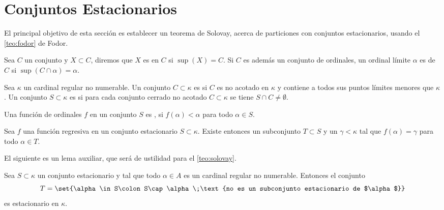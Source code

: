 \section{Conjuntos Estacionarios}

El principal objetivo de esta sección es establecer un teorema
de Solovay, acerca de particiones
con conjuntos estacionarios, usando el \cref{teo:fodor}
de Fodor.

Sea $C$ un conjunto y $X\subset C$, diremos que $X$ es 
en $C$ si $\sup(X) = C$.
Si $C$ es además un conjunto de ordinales, un ordinal límite $\alpha$ es
 de $C$ si $\sup ( C \cap\alpha ) = \alpha$.
\begin{defi}
    Sea $\kappa$ un cardinal regular no numerable. Un conjunto $C\subset \kappa$
    es  si $C$ es no acotado en $\kappa$ y contiene a
    todos sus puntos límites menores que $\kappa$.
    Un conjunto $S\subset\kappa$ es  si para cada conjunto
    cerrado no acotado $C\subset\kappa$ se tiene $S\cap C\neq\emptyset$.
\end{defi}


\begin{defi}
    Una función de ordinales $f$ en un conjunto $S$ es , si
    $f(\alpha)<\alpha$ para todo $\alpha\in S$.
\end{defi}

\begin{teo}\label{teo:fodor}
    Sea $f$ una función regresiva en un conjunto estacionario $S\subset\kappa$.
    Existe entonces un subconjunto $T\subset S$ y un $\gamma<\kappa$ tal que
    $f(\alpha) = \gamma$ para todo $\alpha\in T$.
\end{teo}

El siguiente es un lema auxiliar, que será de ustilidad para el \cref{teo:solovay}.

\begin{lem}
    Sea $S\subset\kappa$ un conjunto estacionario y tal que todo $\alpha\in A$
    es un cardinal regular no numerable. Entonces el conjunto
    \[
        T=\set{\alpha\in S\colon S\cap\alpha\;\text{no es un subconjunto estacionario de $\alpha$}}
    \]
    es estacionario en $\kappa$.
\end{lem}

